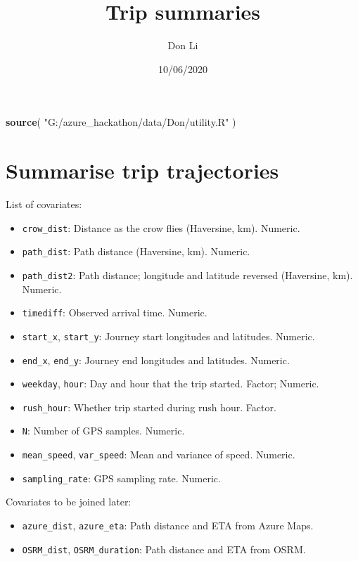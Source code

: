 \documentclass[]{article}
\title{Trip summaries}
\author{Don Li}
\date{10/06/2020}
\newenvironment{Shaded}{\begin{snugshade}}{\end{snugshade}}
\newcommand{\KeywordTok}[1]{\textcolor[rgb]{0.13,0.29,0.53}{\textbf{#1}}}
\newcommand{\NormalTok}[1]{#1}
\newcommand{\StringTok}[1]{\textcolor[rgb]{0.31,0.60,0.02}{#1}}
\providecommand{\tightlist}{%
  \setlength{\itemsep}{0pt}\setlength{\parskip}{0pt}}
\begin{document}
\maketitle

\begin{Shaded}
\begin{Highlighting}[]
\KeywordTok{source}\NormalTok{( }\StringTok{"G:/azure_hackathon/data/Don/utility.R"}\NormalTok{ )}
\end{Highlighting}
\end{Shaded}

\hypertarget{summarise-trip-trajectories}{%
\section{Summarise trip
trajectories}\label{summarise-trip-trajectories}}

List of covariates:

\begin{itemize}
\tightlist
\item
  \texttt{crow\_dist}: Distance as the crow flies (Haversine, km).
  Numeric.
\item
  \texttt{path\_dist}: Path distance (Haversine, km). Numeric.
\item
  \texttt{path\_dist2}: Path distance; longitude and latitude reversed
  (Haversine, km). Numeric.
\item
  \texttt{timediff}: Observed arrival time. Numeric.
\item
  \texttt{start\_x}, \texttt{start\_y}: Journey start longitudes and
  latitudes. Numeric.
\item
  \texttt{end\_x}, \texttt{end\_y}: Journey end longitudes and
  latitudes. Numeric.
\item
  \texttt{weekday}, \texttt{hour}: Day and hour that the trip started.
  Factor; Numeric.
\item
  \texttt{rush\_hour}: Whether trip started during rush hour. Factor.
\item
  \texttt{N}: Number of GPS samples. Numeric.
\item
  \texttt{mean\_speed}, \texttt{var\_speed}: Mean and variance of speed.
  Numeric.
\item
  \texttt{sampling\_rate}: GPS sampling rate. Numeric.
\end{itemize}

Covariates to be joined later:

\begin{itemize}
\tightlist
\item
  \texttt{azure\_dist}, \texttt{azure\_eta}: Path distance and ETA from
  Azure Maps.
\item
  \texttt{OSRM\_dist}, \texttt{OSRM\_duration}: Path distance and ETA
  from OSRM.
\end{itemize}
\end{document}

